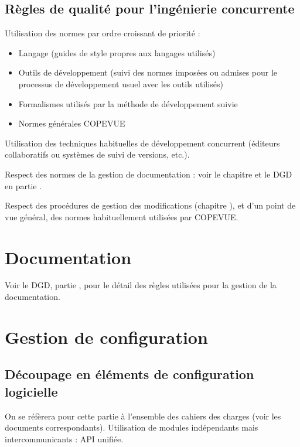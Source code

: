 \section{Règles de qualité pour l'ingénierie concurrente}

Utilisation des normes par ordre croissant de priorité :
\label{list:normes}
\begin{itemize}
\item Langage (guides de style propres aux langages utilisés)
\item Outils de développement (suivi des normes imposées ou admises pour le processus de développement usuel avec les outils utilisés)
\item Formalismes utilisés par la méthode de développement suivie
\item Normes générales COPEVUE
\end{itemize}

Utilisation des techniques habituelles de développement concurrent (éditeurs collaboratifs ou systèmes de suivi de versions, etc.).

Respect des normes de la gestion de documentation : voir le chapitre  et le DGD en partie .

Respect des procédures de gestion des modifications (chapitre ), et d'un point de vue général, des normes habituellement utilisées par COPEVUE.

\chapter{Documentation}

\label{chapter:documentation}

Voir le DGD, partie , pour le détail des règles utilisées pour la gestion de la documentation.

\chapter{Gestion de configuration}

\section{Découpage en éléments de configuration logicielle}

On se réfèrera pour cette partie à l'ensemble des cahiers des charges (voir les documents correspondants). Utilisation de modules indépendants mais intercommunicants : API unifiée.

